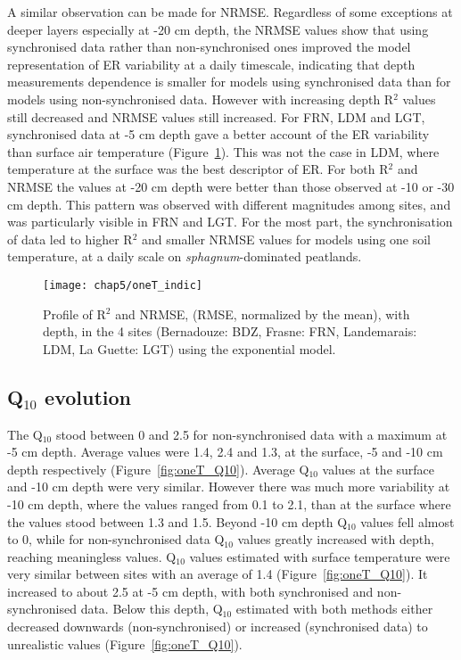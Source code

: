 A similar observation can be made for NRMSE.
Regardless of some exceptions at deeper layers especially at -20 cm depth, the NRMSE values show that using synchronised data rather than non-synchronised ones improved the model representation of ER variability at a daily timescale, indicating that depth measurements dependence is smaller for models using synchronised data than for models using non-synchronised data.
However with increasing depth R$^{2}$ values still decreased and NRMSE values still increased.
For FRN, LDM and LGT, synchronised data at -5 cm depth gave a better account of the ER variability than surface air temperature (Figure~\ref{fig:models_comparison}).
This was not the case in LDM, where temperature at the surface was the best descriptor of ER.
For both R$^{2}$ and NRMSE the values at -20 cm depth were better than those observed at -10 or -30 cm depth.
This pattern was observed with different magnitudes among sites, and was particularly visible in FRN and LGT.
For the most part, the synchronisation of data led to higher R$^{2}$ and smaller NRMSE values for models using one soil temperature, at a daily scale on \textit{sphagnum}-dominated peatlands.

\begin{figure}[]
\centering
\texttt{[image: chap5/oneT\_indic]}
\caption{Profile of R$^{2}$ and NRMSE, (RMSE, normalized by the mean), with depth, in the 4 sites (Bernadouze: BDZ, Frasne: FRN, Landemarais: LDM, La Guette: LGT) using the exponential model.}
\label{fig:models_comparison}
\end{figure}

\subsection{Q$_{10}$ evolution}

The Q$_{10}$ stood between 0 and 2.5 for non-synchronised data with a maximum at -5 cm depth.
Average values were 1.4, 2.4 and 1.3, at the surface, -5 and -10 cm depth respectively (Figure~\ref{fig:oneT_Q10}).
Average Q$_{10}$ values at the surface and -10 cm depth were very similar.
However there was much more variability at -10 cm depth, where the values ranged from 0.1 to 2.1, than at the surface where the values stood between 1.3 and 1.5.
Beyond -10 cm depth Q$_{10}$ values fell almost to 0, while for non-synchronised data Q$_{10}$ values greatly increased with depth, reaching meaningless values.
Q$_{10}$ values estimated with surface temperature were very similar between sites with an average of 1.4 (Figure~\ref{fig:oneT_Q10}).
It increased to about 2.5 at -5 cm depth, with both synchronised and non-synchronised data.
Below this depth, Q$_{10}$ estimated with both methods either decreased downwards (non-synchronised) or increased (synchronised data) to unrealistic values (Figure~\ref{fig:oneT_Q10}).

